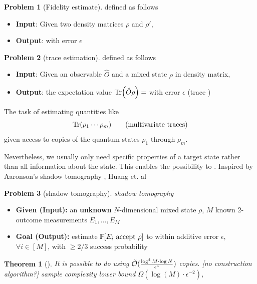 \documentclass[
10pt,
aps,
pra,
linenumbers,
floatfix,
]{revtex4-2}
\theoremstyle{plain}
\newtheorem{theorem}{Theorem}
\theoremstyle{definition}
\newtheorem{problem}{Problem}
\newcommand{\ob}{\hat{O}}
\newcommand{\dm}{\rho}
\begin{document}
\begin{problem}[Fidelity estimate]
	defined as follows
	\begin{itemize}
		\item \textbf{Input}: Given two density matrices $\dm$ and $\dm'$, 
		\item \textbf{Output}:  with error $\epsilon$
	\end{itemize}
\end{problem}
\begin{problem}[trace estimation]\label{prm:trace_estimation}
	defined as follows
	\begin{itemize}
		\item \textbf{Input}: Given an observable $\ob$ and a mixed state $\dm$ in density matrix,
		\item \textbf{Output}: the expectation value $\Tr(\ob \dm) = $ with error $\epsilon$ (trace )
	\end{itemize}
		The task of estimating quantities like 
		\begin{equation}
			\Tr(\rho_1 \cdots \rho_m)
			\tag{multivariate traces}
		\end{equation}
		given access to copies of the quantum states $\rho_1$  through $\rho_m$.
\end{problem}
Nevertheless, we usually only need specific properties of a target state rather than all information about the state.
This enables the possibility to .
Inspired by Aaronson's shadow tomography \cite{aaronsonShadowTomographyQuantum2018}, Huang et. al \cite{huangPredictingManyProperties2020}
\begin{problem}[shadow tomography]\label{prm:shadow_tomography}
	\emph{shadow tomography}
	\begin{itemize}
		\item \textbf{Given (Input):} an \textbf{unknown} $N$-dimensional mixed state $\rho$, $M$ known 2-outcome measurements $E_1,\dots,E_M$
		\item \textbf{Goal (Output):} estimate $\probability[E_i \text{ accept } \dm]$ to within additive error $\epsilon$, $\forall i\in [M]$, with $\ge 2/3$ success probability
	\end{itemize}
\end{problem}
\begin{theorem}[\cite{aaronsonShadowTomographyQuantum2018}]\label{thm:shadow_tomography}
	It is possible to do  using $\tilde{\mathcal{O}}(\frac{\log^4 M\cdot \log N}{\epsilon^4})$ copies. [no construction algorithm?]
	sample complexity lower bound $\Omega(\log (M) \cdot \epsilon^{-2})$, 
\end{theorem}
\end{document}
